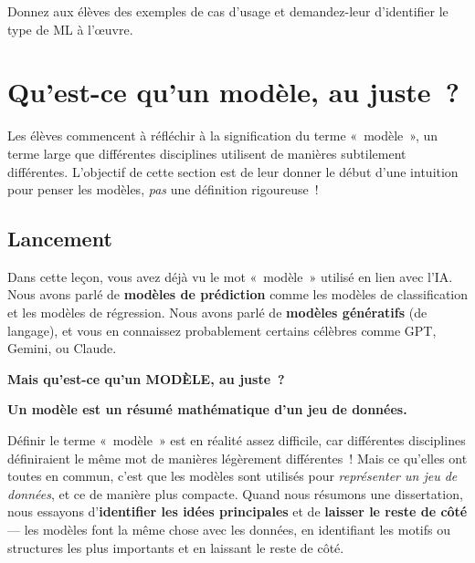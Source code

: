 \documentclass[12pt,a4paper]{article}
\begin{document}
\begin{activitybox}
  Donnez aux élèves des exemples de cas d'usage et demandez-leur d'identifier le type de ML à l'œuvre.
\end{activitybox}

\newpage

\section{Qu'est-ce qu'un modèle, au juste~?}

\begin{overviewbox}
  Les élèves commencent à réfléchir à la signification du terme «~modèle~», un terme large que différentes disciplines utilisent de manières subtilement différentes. L'objectif de cette section est de leur donner le début d'une intuition pour penser les modèles, \emph{pas} une définition rigoureuse~!
\end{overviewbox}

\subsection{Lancement}

Dans cette leçon, vous avez déjà vu le mot «~modèle~» utilisé en lien avec l'IA. Nous avons parlé de \textbf{modèles de prédiction} comme les modèles de classification et les modèles de régression. Nous avons parlé de \textbf{modèles génératifs} (de langage), et vous en connaissez probablement certains célèbres comme GPT, Gemini, ou Claude.

\begin{thinkbox}
  \centering
  \textbf{Mais qu'est-ce qu'un MODÈLE, au juste~?}
\end{thinkbox}

\begin{keypointbox}
  \textbf{Un modèle est un résumé mathématique d'un jeu de données.}
\end{keypointbox}

Définir le terme «~modèle~» est en réalité assez difficile, car différentes disciplines définiraient le même mot de manières légèrement différentes~! Mais ce qu'elles ont toutes en commun, c'est que les modèles sont utilisés pour \emph{représenter un jeu de données}, et ce de manière plus compacte. Quand nous résumons une dissertation, nous essayons d'\textbf{identifier les idées principales} et de \textbf{laisser le reste de côté} — les modèles font la même chose avec les données, en identifiant les motifs ou structures les plus importants et en laissant le reste de côté.
\end{document}
